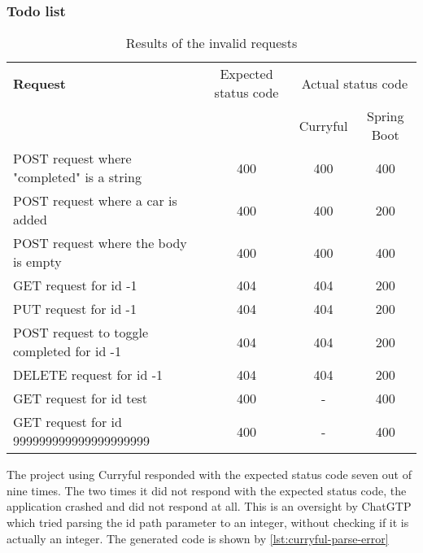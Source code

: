 \documentclass[a4paper]{article}
\begin{document}
\subsubsection{Todo list}
\begin{table}[h!]
	\begin{tabularx}{\textwidth}{|X|c|c|c|}
		\hline
		\textbf{Request}                           & Expected status code & \multicolumn{2}{c|}{Actual status code}               \\
		                                           &                      & Curryful                                & Spring Boot \\
		\hline
		POST request where "completed" is a string & 400                  & 400                                     & 400         \\
		POST request where a car is added          & 400                  & 400                                     & 200         \\
		POST request where the body is empty       & 400                  & 400                                     & 400         \\
		GET request for id -1                      & 404                  & 404                                     & 200         \\
		PUT request for id -1                      & 404                  & 404                                     & 200         \\
		POST request to toggle completed for id -1 & 404                  & 404                                     & 200         \\
		DELETE request for id -1                   & 404                  & 404                                     & 200         \\
		GET request for id test                    & 400                  & -                                       & 400         \\
		GET request for id 999999999999999999999   & 400                  & -                                       & 400         \\
		\hline
	\end{tabularx}
	\caption{Results of the invalid requests}
\end{table}

\noindent The project using Curryful responded with the expected status code
seven out of nine times. The two times it did not respond with the expected
status code, the application crashed and did not respond at all. This is an
oversight by ChatGTP which tried parsing the id path parameter to an integer,
without checking if it is actually an integer. The generated code is shown by
\ref{lst:curryful-parse-error}
\end{document}
